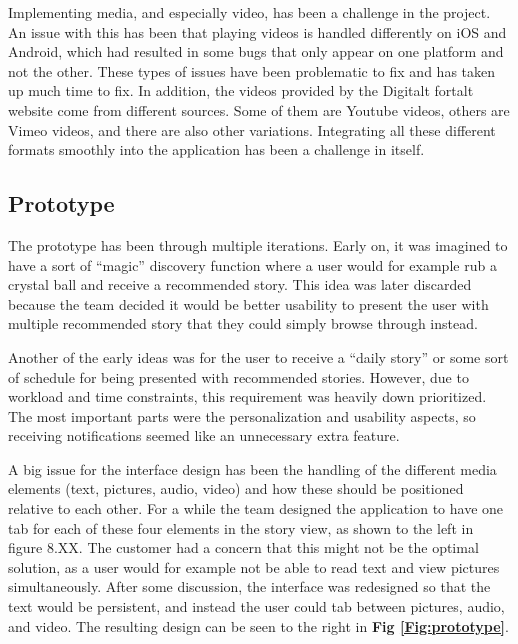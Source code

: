 Implementing media, and especially video, has been a challenge in the project. An issue with this has been that playing videos is handled differently on iOS and Android, which had resulted in some bugs that only appear on one platform and not the other. These types of issues have been problematic to fix and has taken up much time to fix. In addition, the videos provided by the Digitalt fortalt website come from different sources. Some of them are Youtube videos, others are Vimeo videos, and there are also other variations. Integrating all these different formats smoothly into the application has been a challenge in itself.

\subsection{Prototype}

The prototype has been through multiple iterations. Early on, it was imagined to have a sort of “magic” discovery function where a user would for example rub a crystal ball and receive a recommended story. This idea was later discarded because the team decided it would be better usability to present the user with multiple recommended story that they could simply browse through instead.\newline

Another of the early ideas was for the user to receive a “daily story” or some sort of schedule for being presented with recommended stories. However, due to workload and time constraints, this requirement was heavily down prioritized. The most important parts were the personalization and usability aspects, so receiving notifications seemed like an unnecessary extra feature.\newline

A big issue for the interface design has been the handling of the different media elements (text, pictures, audio, video) and how these should be positioned relative to each other. For a while the team designed the application to have one tab for each of these four elements in the story view, as shown to the left in figure 8.XX. The customer had a concern that this might not be the optimal solution, as a user would for example not be able to read text and view pictures simultaneously. After some discussion, the interface was redesigned so that the text would be persistent, and instead the user could tab between pictures, audio, and video. The resulting design can be seen to the right in \textbf{Fig \ref{Fig:prototype}}. 

